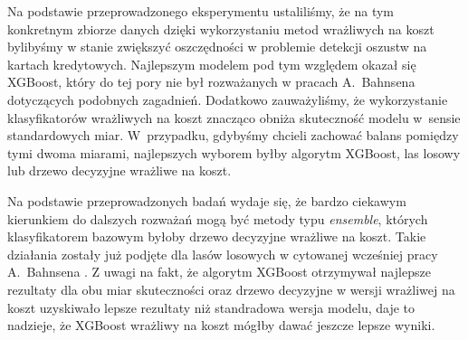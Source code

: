 \documentclass[inzynierska]{pwr_wmat_praca_dyplomowa}
\theoremstyle{plain}
\numberwithin{theorem}{chapter}
\theoremstyle{definition}
\numberwithin{theorem}{chapter}
\begin{document}
Na podstawie przeprowadzonego eksperymentu ustaliliśmy, że na tym konkretnym zbiorze danych dzięki wykorzystaniu metod wrażliwych na koszt bylibyśmy w stanie zwiększyć oszczędności w problemie detekcji oszustw na kartach kredytowych. Najlepszym modelem pod tym względem okazał się XGBoost, który do tej pory nie był rozważanych w pracach A.~Bahnsena dotyczących podobnych zagadnień. Dodatkowo zauważyliśmy, że wykorzystanie klasyfikatorów wrażliwych na koszt znacząco obniża skuteczność modelu w~sensie standardowych miar. W~przypadku, gdybyśmy chcieli zachować balans pomiędzy tymi dwoma miarami, najlepszych wyborem byłby algorytm XGBoost, las losowy lub drzewo decyzyjne wrażliwe na koszt.

Na podstawie przeprowadzonych badań wydaje się, że bardzo ciekawym kierunkiem do dalszych rozważań mogą być metody typu \textit{ensemble}, których klasyfikatorem bazowym byłoby drzewo decyzyjne wrażliwe na koszt. Takie działania zostały już podjęte dla lasów losowych w cytowanej wcześniej pracy A.~Bahnsena \cite{alej2015ensemble}. Z uwagi na fakt, że algorytm XGBoost otrzymywał najlepsze rezultaty dla obu miar skuteczności oraz drzewo decyzyjne w wersji wrażliwej na koszt uzyskiwało lepsze rezultaty niż standradowa wersja modelu, daje to nadzieje, że XGBoost wrażliwy na koszt mógłby dawać jeszcze lepsze wyniki.

\backmatter
\nocite{*}

\end{document}
